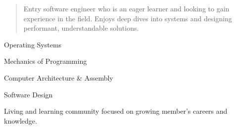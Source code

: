   \begin{quote}
    Entry software engineer who is an eager learner and looking to gain experience in the field. Enjoys deep dives into systems and designing performant, understandable solutions.
  \end{quote}


  \smallskip{}

  \smallskip{}
  \cvtag{\LaTeX}
  
  Operating Systems \par
  Mechanics of Programming \par
  Computer Architecture \& Assembly \par
  Software Design


  Living and learning community focused on growing member's careers and knowledge.

